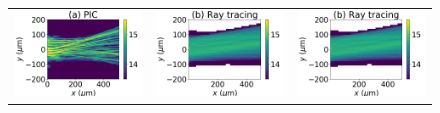 \documentclass[%
 reprint,
 amsmath,amssymb,
 aps,
]{revtex4-1}
\begin{document}
\begin{figure}
\begin{tabular}{ccc}
\includegraphics[scale=0.39]{Figure/I_Smilei18ps_te1keV_Ti1keV_.png}
&\includegraphics[scale=0.39]{Figure/I_HERA18ps_te1keV_Ti1keV_.png}
&\includegraphics[scale=0.39]{Figure/I_HERA18ps_te1keV_Ti1keV_.png}\\

\end{tabular}
\end{figure}
\end{document}
